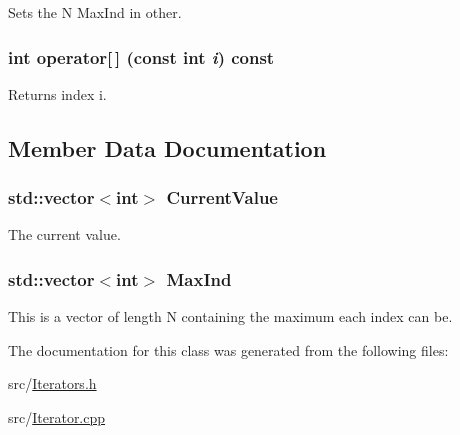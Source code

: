 Sets the N MaxInd in other. \hypertarget{classJKBuilder_1_1Iterator_a74247cf730a06b23fcb1ec64e5596b25}{
\subsubsection[{operator[]}]{\setlength{\rightskip}{0pt plus 5cm}int operator\mbox{[}$\,$\mbox{]} (const int {\em i}) const}}
\label{classJKBuilder_1_1Iterator_a74247cf730a06b23fcb1ec64e5596b25}


Returns index i. 

\subsection{Member Data Documentation}
\hypertarget{classJKBuilder_1_1Iterator_a20ca24f6d827aba144bb087c4bcb74a0}{
\subsubsection[{CurrentValue}]{\setlength{\rightskip}{0pt plus 5cm}std::vector$<$int$>$ {\bf CurrentValue}}}
\label{classJKBuilder_1_1Iterator_a20ca24f6d827aba144bb087c4bcb74a0}


The current value. \hypertarget{classJKBuilder_1_1Iterator_ab6b56d3c4e9353bc938dd6249cde9ca0}{
\subsubsection[{MaxInd}]{\setlength{\rightskip}{0pt plus 5cm}std::vector$<$int$>$ {\bf MaxInd}}}
\label{classJKBuilder_1_1Iterator_ab6b56d3c4e9353bc938dd6249cde9ca0}


This is a vector of length N containing the maximum each index can be. 

The documentation for this class was generated from the following files:\begin{DoxyCompactItemize}
\item 
src/\hyperlink{Iterators_8h}{Iterators.h}\item 
src/\hyperlink{Iterator_8cpp}{Iterator.cpp}\end{DoxyCompactItemize}
